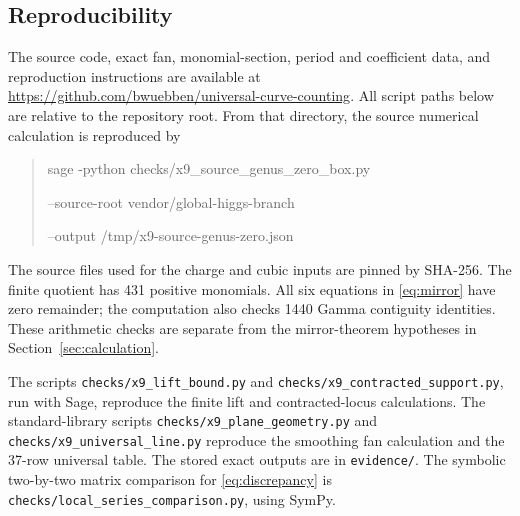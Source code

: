 \subsection*{Reproducibility}
The source code, exact fan, monomial-section, period and coefficient
data, and reproduction instructions are available at
\url{https://github.com/bwuebben/universal-curve-counting}.
All script paths below are relative to the repository root.
From that directory, the source numerical calculation is reproduced by
\begin{quote}\ttfamily\small
sage -python checks/x9\_source\_genus\_zero\_box.py\par
\quad --source-root vendor/global-higgs-branch\par
\quad --output /tmp/x9-source-genus-zero.json
\end{quote}
The source files used for the charge and cubic inputs are pinned by
SHA-256. The finite quotient has 431 positive monomials. All six
equations in \eqref{eq:mirror} have zero remainder; the computation
also checks 1440 Gamma contiguity identities. These arithmetic
checks are separate from the mirror-theorem hypotheses in
Section~\ref{sec:calculation}.

The scripts \texttt{checks/x9\_lift\_bound.py} and
\texttt{checks/x9\_contracted\_support.py}, run with Sage, reproduce
the finite lift and contracted-locus calculations.
The standard-library scripts \texttt{checks/x9\_plane\_geometry.py}
and \texttt{checks/x9\_universal\_line.py} reproduce the smoothing
fan calculation and the 37-row universal table. The stored exact
outputs are in \texttt{evidence/}. The symbolic two-by-two matrix
comparison for \eqref{eq:discrepancy} is
\texttt{checks/local\_series\_comparison.py}, using SymPy.
